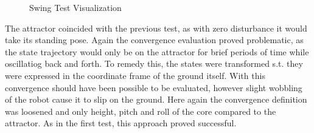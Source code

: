 \begin{figure}[h!]
    \caption{Swing Test Visualization}
    \label{fig:swinglkg}
    \end{figure}
    The attractor coincided with the previous test, as with zero disturbance it would take its standing pose. 
    Again the convergence evaluation proved problematic, as the state trajectory would only be on the attractor for brief periods of time while oscillatiog back and forth. To remedy this, the states were transformed s.t. they were expressed in the coordinate frame of the ground itself. With this convergence should have been possible to be evaluated, however slight wobbling of the robot cause it to slip on the ground. Here again the convergence definition was loosened and only height, pitch and roll of the core compared to the attractor. As in the first test, this approach proved successful. 

     


